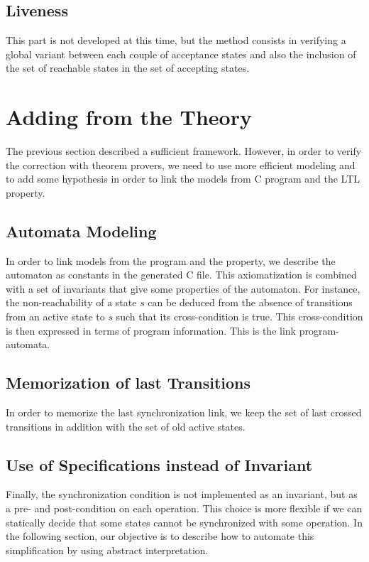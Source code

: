 \documentclass{report}
\begin{document}
\subsection{Liveness}

This part is not developed at this time, but the method consists in verifying a
global variant between each couple of acceptance states and also the inclusion
of the set of reachable states in the set of accepting states.

\section{Adding from the Theory}

The previous section described a sufficient framework. However, in
order to verify the correction with theorem provers, we need to use
more efficient modeling and to add some hypothesis in order to link
the models from C program and the LTL property.

\subsection{ Automata Modeling}
  In order to link models from the program and the property, we describe the
  automaton as constants in the generated C file. This axiomatization is
  combined with a set of invariants that give some properties of the
  automaton. For instance, the non-reachability of a state $s$ can be deduced
  from the absence of transitions from an active state to $s$ such that its
  cross-condition is true. This cross-condition is then expressed in terms of
  program information. This is the link program-automata.


\subsection{Memorization of last Transitions}
  In order to memorize the last synchronization link, we keep the set of last
  crossed transitions in addition with the set of old active states.

\subsection{Use of Specifications instead of Invariant}
  Finally, the synchronization condition is not implemented as an invariant, but
  as a pre- and post-condition on each operation. This choice is more flexible if
  we can statically decide that some states cannot be synchronized with some
  operation. In the following section, our objective is to describe how to
  automate this simplification by using abstract interpretation.
\end{document}
